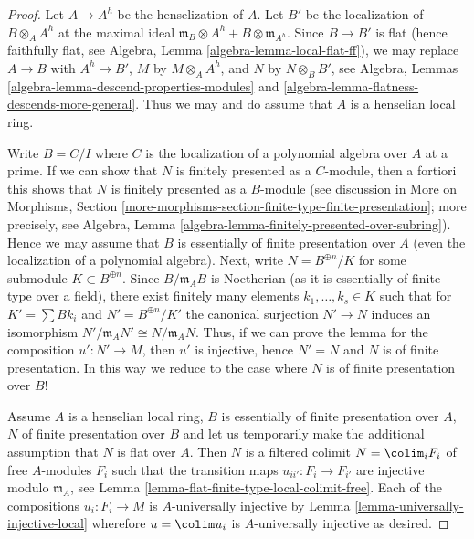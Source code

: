 \begin{proof}
Let $A \to A^h$ be the henselization of $A$. Let $B'$ be the localization
of $B \otimes_A A^h$ at the maximal ideal
$\mathfrak m_B \otimes A^h + B \otimes \mathfrak m_{A^h}$.
Since $B \to B'$ is flat (hence faithfully flat, see
Algebra, Lemma \ref{algebra-lemma-local-flat-ff}),
we may replace $A \to B$ with $A^h \to B'$,
$M$ by $M \otimes_A A^h$, and $N$ by $N \otimes_B B'$, see
Algebra, Lemmas \ref{algebra-lemma-descend-properties-modules} and
\ref{algebra-lemma-flatness-descends-more-general}.
Thus we may and do assume that $A$ is a henselian local ring.

\medskip\noindent
Write $B = C/I$ where $C$ is the localization of a polynomial algebra
over $A$ at a prime. If we can show that $N$ is finitely presented as
a $C$-module, then a fortiori this shows that $N$ is finitely presented
as a $B$-module (see discussion in
More on Morphisms, Section
\ref{more-morphisms-section-finite-type-finite-presentation};
more precisely, see
Algebra, Lemma \ref{algebra-lemma-finitely-presented-over-subring}).
Hence we may assume that $B$ is essentially of finite
presentation over $A$ (even the localization of a polynomial algebra).
Next, write $N = B^{\oplus n}/K$ for some submodule $K \subset B^{\oplus n}$.
Since $B/\mathfrak m_AB$ is Noetherian (as it is essentially of finite type
over a field), there exist finitely many elements
$k_1, \ldots, k_s \in K$ such that for $K' = \sum Bk_i$
and $N' = B^{\oplus n}/K'$ the canonical surjection
$N' \to N$ induces an isomorphism $N'/\mathfrak m_AN' \cong N/\mathfrak m_AN$.
Thus, if we can prove the lemma for the composition $u' : N' \to M$,
then $u'$ is injective, hence $N' = N$ and $N$ is of finite presentation.
In this way we reduce to the case where $N$ is of finite presentation
over $B$!

\medskip\noindent
Assume $A$ is a henselian local ring, $B$ is essentially
of finite presentation over $A$, $N$ of finite presentation over $B$ and
let us temporarily make the additional assumption that $N$ is flat over $A$.
Then $N$ is a filtered colimit $N = \colim_i F_i$
of free $A$-modules $F_i$ such that the transition maps
$u_{ii'} : F_i \to F_{i'}$ are injective modulo $\mathfrak m_A$, see
Lemma \ref{lemma-flat-finite-type-local-colimit-free}.
Each of the compositions $u_i : F_i \to M$ is $A$-universally
injective by
Lemma \ref{lemma-universally-injective-local}
wherefore $u = \colim u_i$ is $A$-universally injective as desired.


\end{proof}
